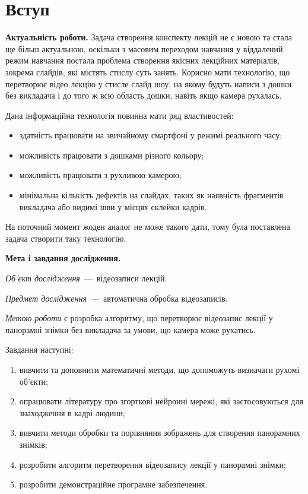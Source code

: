 \chapter*{Вступ}

\textbf{Актуальність роботи.}
Задача створення конспекту лекцій не є новою
та стала ще більш актуальною,
оскільки з масовим переходом навчання у віддалений режим навчання
постала проблема створення якісних
лекційних матеріалів, зокрема слайдів, які містять
стислу суть занять. Корисно мати технологію, що
перетворює відео лекцію у стисле слайд шоу, на
якому будуть написи з дошки без викладача і до того
ж всю область дошки, навіть якщо камера
рухалась.

Дана інформаційна технологія повинна мати ряд властивостей:
\begin{itemize}
      \item здатність працювати на звичайному смартфоні у режимі реального часу;
      \item можливість працювати з дошками різного кольору;
      \item можливість працювати з рухливою камерою;
      \item мінімальна кількість дефектів на слайдах,
            таких як наявність фрагментів викладача
            або видимі шви у місцях склейки кадрів.
\end{itemize}
На поточний момент жоден аналог не може такого дати, тому була поставлена
задача створити таку технологію.

\textbf{Мета і завдання дослідження.}

\textit{Об'єкт дослідження}~---~відеозаписи лекцій.

\textit{Предмет дослідження}~---~автоматична обробка
відеозаписів.

\textit{Метою роботи} є розробка алгоритму, що перетворює
відеозапис лекції у панорамні знімки без викладача
за умови, що камера може рухатись.

Завдання наступні:
\begin{enumerate}
      \item
            вивчити та доповнити математичні методи,
            що допоможуть визначати рухомі об'єкти;
      \item
            опрацювати літературу про згорткові нейронні мережі, які застосовуються
            для знаходження в кадрі людини;
      \item
            вивчити методи обробки та порівняння зображень для створення панорамних знімків;
      \item
            розробити алгоритм перетворення відеозапису лекції у панорамні знімки;
      \item
            розробити демонстраційне програмне забезпечення.
\end{enumerate}

